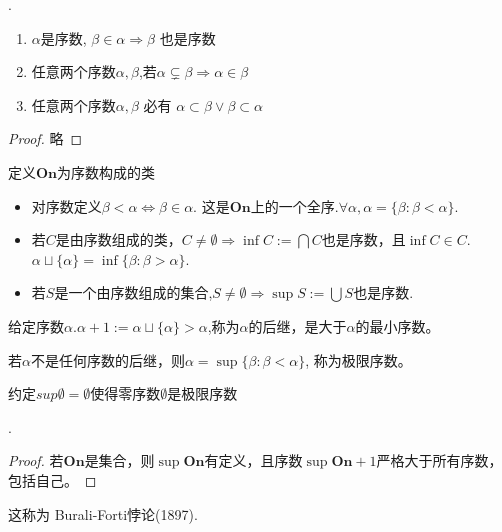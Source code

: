 \begin{Lem}[序数的性质].
    \begin{enumerate}
        \item $\alpha $是序数, $\beta \in \alpha \Rightarrow \beta$ 也是序数
        \item 任意两个序数$\alpha ,\beta $,若$\alpha \subsetneq \beta \Rightarrow \alpha \in \beta $
        \item 任意两个序数$\alpha ,\beta $ 必有 $\alpha \subset \beta \vee \beta  \subset \alpha $ 
    \end{enumerate}
    \begin{proof}
        略
    \end{proof}
\end{Lem}
\begin{Them}定义$\mathbf{On}$为序数构成的类
    \begin{itemize}
        \item 对序数定义$\beta < \alpha \Leftrightarrow \beta \in \alpha $. 这是$\mathbf{On}$上的一个全序.$\forall \alpha , \alpha =\{\beta :\beta <\alpha \}$.
        \item 若$C$是由序数组成的类，$C\neq \emptyset \Rightarrow \inf C:=\bigcap C$也是序数，且$\inf C \in C$. $\alpha \sqcup \{\alpha \}=\inf\{\beta : \beta > \alpha \}$.
        \item 若$S$是一个由序数组成的集合,$S\neq \emptyset \Rightarrow \sup S:=\bigcup S$也是序数.
    \end{itemize}
    给定序数$\alpha. \alpha +1:=\alpha \sqcup \{\alpha \}>\alpha $,称为$\alpha $的后继，是大于$\alpha $的最小序数。

    若$\alpha $不是任何序数的后继，则$\alpha =\sup\{\beta :\beta <\alpha \}$, 称为极限序数。

    约定$sup \emptyset=\emptyset$使得零序数$\emptyset $是极限序数
\end{Them}

\begin{Them}.
    \begin{proof}
        若$\mathbf{On}$是集合，则$\sup \mathbf{On}$有定义，且序数$\sup \mathbf{On}+1$严格大于所有序数，包括自己。
    \end{proof}

    这称为 Burali-Forti悖论(1897).
\end{Them}

